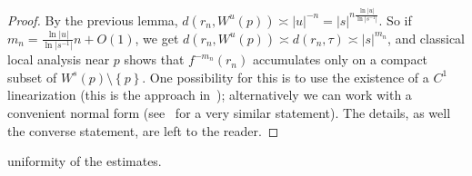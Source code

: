 \documentclass[11pt, oneside]{amsart}
\newcommand{\set}[1]{\left\{#1\right\}}
\newcommand{\abs}[1]{\left\vert#1\right\vert}
\newcommand{\la}{\lambda}
\newcommand{\inv}{^{-1}}
\theoremstyle{remark}
\newtheorem{rmk}[prop]{Remark}
\theoremstyle{definition}
\theoremstyle{theorem}
\newcommand{\commentaire}[1]{}
\begin{document}
 \begin{proof}
By the previous lemma, $d(r_n, W^u(p))\asymp \abs{u} ^{-n} = \abs{s}^{n \frac{\ln \abs{u}}{\ln\abs{s\inv}}}$. So if $m_n = \frac{\ln{\abs{u}}}{\ln\abs{s\inv}} n + O(1)$, we get 
  $d(r_n, W^u(p))\asymp d(r_n, \tau)\asymp \abs{s}^{m_n}$, and 
  classical  local analysis near $p$  shows that 
  $f^{-m_n}(r_n)$ accumulates  only on a compact subset of $W^s(p)\setminus \set{p}$. One possibility 
  for this is to use the existence of a $C^1$ linearization (this is the approach in~\cite{palis_moduli}); 
  alternatively we can work 
 with a convenient normal form (see~\cite[Lem. 4.2]{df:DMM} for a very similar statement). 
  The details, as well the converse statement, are left to the reader.
 \end{proof}
 

 uniformity of the estimates.  \commentaire{New step in the proof to give some details on the dependence on parameters, cf Exposition remark \#3. }
\end{document}
